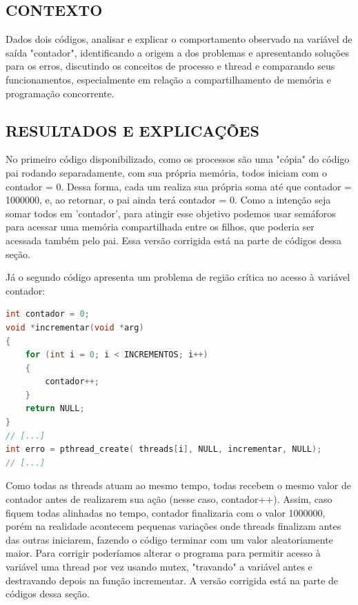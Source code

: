 \documentclass[12pt, openright, oneside, a4paper, brazil]{article}
\newcommand{\subtUm}{CONTEXTO}
\newcommand{\subtDois}{RESULTADOS E EXPLICAÇÕES}
\begin{document}
		\subsection{\subtUm}
		\par{Dados dois códigos, analisar e explicar o comportamento observado na variável de saída "contador", identificando a origem a dos problemas e apresentando soluções para os erros, discutindo os conceitos de processo e thread e comparando seus funcionamentos, especialmente em relação a compartilhamento de memória e programação concorrente.}
		\subsection{\subtDois}
		\par{
		No primeiro código disponibilizado, como os processos são uma "cópia" do código pai rodando separadamente, com sua própria memória, todos iniciam com o contador = 0. Dessa forma, cada um realiza sua própria soma até que contador = 1000000, e, ao retornar, o pai ainda terá contador = 0. Como a intenção seja somar todos em 'contador', para atingir esse objetivo podemos usar semáforos para acessar uma memória compartilhada entre os filhos, que poderia ser acessada também pelo pai. Essa versão corrigida está na parte de códigos dessa seção.
		}
		\par{
		Já o segundo código apresenta um problema de região crítica no acesso à variável contador:
		}
		\begin{lstlisting}[language=c]
int contador = 0;
void *incrementar(void *arg)
{
	for (int i = 0; i < INCREMENTOS; i++)
	{
		contador++;
	}
	return NULL;
}
// [...]
int erro = pthread_create( threads[i], NULL, incrementar, NULL);
// [...]
		\end{lstlisting}
		\par{
		Como todas as threads atuam ao mesmo tempo, todas recebem o mesmo valor de contador antes de realizarem sua ação (nesse caso, contador++). Assim, caso fiquem todas alinhadas no tempo, contador finalizaria com o valor 1000000, porém na realidade acontecem pequenas variações onde threads finalizam antes das outras iniciarem, fazendo o código terminar com um valor aleatoriamente maior. Para corrigir poderíamos alterar o programa para permitir acesso à variável uma thread por vez usando mutex, "travando" a variável antes e destravando depois na função incrementar. A versão corrigida está na parte de códigos dessa seção.
		}
\end{document}
